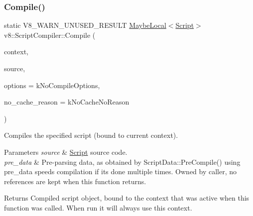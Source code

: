 \subsubsection{\texorpdfstring{Compile()}{Compile()}\hspace{0.1cm}{\footnotesize\ttfamily [1/2]}}
{\footnotesize\ttfamily static V8\+\_\+\+W\+A\+R\+N\+\_\+\+U\+N\+U\+S\+E\+D\+\_\+\+R\+E\+S\+U\+LT \mbox{\hyperlink{classv8_1_1MaybeLocal}{Maybe\+Local}}$<$\mbox{\hyperlink{classv8_1_1Script}{Script}}$>$ v8\+::\+Script\+Compiler\+::\+Compile (\begin{DoxyParamCaption}\item[{\mbox{\hyperlink{classv8_1_1Local}{Local}}$<$ \mbox{\hyperlink{classv8_1_1Context}{Context}} $>$}]{context,  }\item[{\mbox{\hyperlink{classv8_1_1ScriptCompiler_1_1Source}{Source}} $\ast$}]{source,  }\item[{Compile\+Options}]{options = {\ttfamily kNoCompileOptions},  }\item[{\mbox{\hyperlink{classv8_1_1ScriptCompiler_a7f13fa15484cfc500ae51927756e0d60}{No\+Cache\+Reason}}}]{no\+\_\+cache\+\_\+reason = {\ttfamily kNoCacheNoReason} }\end{DoxyParamCaption})\hspace{0.3cm}{\ttfamily [static]}}

Compiles the specified script (bound to current context).


\begin{DoxyParams}{Parameters}
{\em source} & \mbox{\hyperlink{classv8_1_1Script}{Script}} source code. \\
\hline
{\em pre\+\_\+data} & Pre-\/parsing data, as obtained by Script\+Data\+::\+Pre\+Compile() using pre\+\_\+data speeds compilation if it\textquotesingle{}s done multiple times. Owned by caller, no references are kept when this function returns. \\
\hline
\end{DoxyParams}
\begin{DoxyReturn}{Returns}
Compiled script object, bound to the context that was active when this function was called. When run it will always use this context. 
\end{DoxyReturn}
\mbox{\label{classv8_1_1ScriptCompiler_a2381d1572e778efee274caaaaa765e0c}} 
